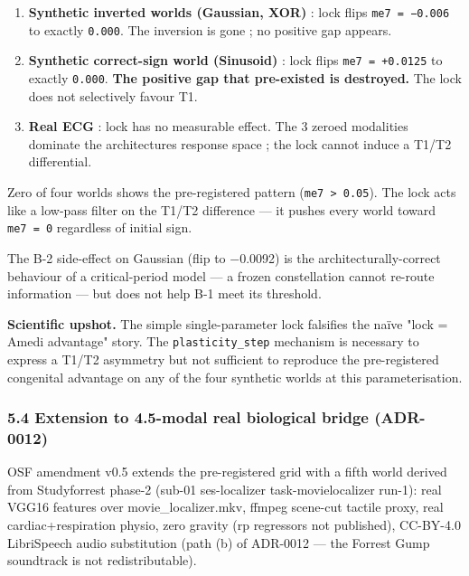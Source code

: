 \documentclass[
]{article}
\providecommand{\tightlist}{%
  \setlength{\itemsep}{0pt}\setlength{\parskip}{0pt}}
\begin{document}
\begin{enumerate}
\def\labelenumi{\arabic{enumi}.}
\tightlist
\item
  \textbf{Synthetic inverted worlds (Gaussian, XOR)} : lock flips
  \texttt{me7\ =\ −0.006} to exactly \texttt{0.000}. The inversion is
  gone ; no positive gap appears.
\item
  \textbf{Synthetic correct-sign world (Sinusoid)} : lock flips
  \texttt{me7\ =\ +0.0125} to exactly \texttt{0.000}. \textbf{The
  positive gap that pre-existed is destroyed.} The lock does not
  selectively favour T1.
\item
  \textbf{Real ECG} : lock has no measurable effect. The 3 zeroed
  modalities dominate the architecture\textquotesingle s response space
  ; the lock cannot induce a T1/T2 differential.
\end{enumerate}

Zero of four worlds shows the pre-registered pattern
(\texttt{me7\ \textgreater{}\ 0.05}). The lock acts like a low-pass
filter on the T1/T2 difference --- it pushes every world toward
\texttt{me7\ =\ 0} regardless of initial sign.

The B-2 side-effect on Gaussian (flip to −0.0092) is the
architecturally-correct behaviour of a critical-period model --- a
frozen constellation cannot re-route information --- but does not help
B-1 meet its threshold.

\textbf{Scientific upshot.} The simple single-parameter lock falsifies
the naïve "lock = Amedi advantage" story. The \texttt{plasticity\_step}
mechanism is necessary to express a T1/T2 asymmetry but not sufficient
to reproduce the pre-registered congenital advantage on any of the four
synthetic worlds at this parameterisation.

\subsubsection{5.4 Extension to 4.5-modal real biological bridge
(ADR-0012)}\label{54-extension-to-45-modal-real-biological-bridge-adr-0012}

OSF amendment v0.5 extends the pre-registered grid with a fifth world
derived from Studyforrest phase-2 (sub-01 ses-localizer
task-movielocalizer run-1): real VGG16 features over
movie\_localizer.mkv, ffmpeg scene-cut tactile proxy, real
cardiac+respiration physio, zero gravity (rp regressors not published),
CC-BY-4.0 LibriSpeech audio substitution (path (b) of ADR-0012 --- the
Forrest Gump soundtrack is not redistributable).
\end{document}
